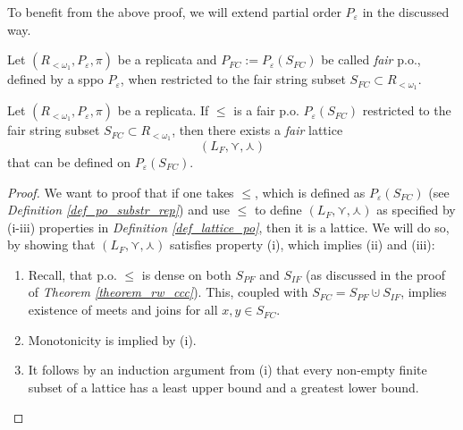 To benefit from the above proof, we will extend partial order $P_{\varepsilon}$ in the discussed way.

\begin{definition}\label{def_fair_po}
  Let $(R_{<\omega_1}, P_{\varepsilon}, \pi)$ be a replicata and $P_{FC} := P_{\varepsilon}(S_{FC})$ be called \textit{fair} p.o., defined by a sppo $P_{\varepsilon}$, when restricted to the fair string subset $S_{FC} \subset R_{<\omega_1}$.
\end{definition}

\begin{lemma}\label{lemma_fair_lattice}
  Let $(R_{<\omega_1}, P_{\varepsilon}, \pi)$ be a replicata. If $\leq$ is a fair p.o. $P_{\varepsilon}(S_{FC})$ restricted to the fair string subset $S_{FC} \subset R_{<\omega_1}$, then there exists a \textit{fair} lattice
    \[ (L_{F}, \curlyvee, \curlywedge) \]
  that can be defined on $P_{\varepsilon}(S_{FC})$.
\end{lemma}
\begin{proof}
  We want to proof that if one takes $\leq$, which is defined as $P_{\varepsilon}(S_{FC})$ (see \textit{Definition \ref{def_po_substr_rep}}) and use $\leq$ to define $(L_{F}, \curlyvee, \curlywedge)$ as specified by (i-iii) properties in \textit{Definition \ref{def_lattice_po}}, then it is a lattice. We will do so, by showing that $(L_{F}, \curlyvee, \curlywedge)$ satisfies property (i), which implies (ii) and (iii):

  \begin{enumerate}[label=(\roman*)]
    \item Recall, that p.o. $\leq$ is dense on both $S_{PF}$ and $S_{IF}$ (as discussed in the proof of \textit{Theorem \ref{theorem_rw_ccc}}). This, coupled with $S_{FC} = S_{PF} \cupdot S_{IF}$, implies existence of meets and joins for all $x,y \in S_{FC}$.
    \item Monotonicity is implied by (i).
    \item It follows by an induction argument from (i) that every non-empty finite subset of a lattice has a least upper bound and a greatest lower bound.
  \end{enumerate}
\end{proof}

